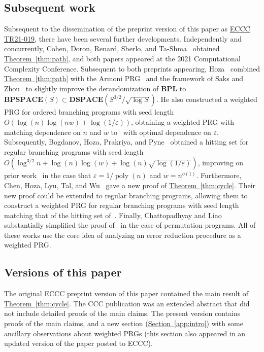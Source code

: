 \documentclass[11pt]{article}
\numberwithin{equation}{section}
\theoremstyle{definition}
\theoremstyle{plain}
\newcommand{\expref}[2]{\hyperref[#2]{#1~\ref{#2}}}
\newcommand{\eps}{\varepsilon}
\newcommand{\poly}{\operatorname{poly}}
\begin{document}
\subsection{Subsequent work}
Subsequent to the dissemination of the preprint version of this %
paper %
%
%
%
%
%
%
as \href{https://eccc.weizmann.ac.il/report/2021/019/}{ECCC TR21-019},
there have been several further developments. Independently and concurrently, Cohen, Doron, Renard, Sberlo, and Ta-Shma~\cite{CohenDoReSbTa21} obtained \expref{Theorem}{thm:path}, and both papers appeared at the 2021 Computational Complexity Conference. 
%
Subsequent to both preprints appearing, Hoza~\cite{Hoza21} combined \expref{Theorem}{thm:path} with the Armoni PRG~\cite{Armoni98} and the framework of Saks and Zhou~\cite{SaksZh99} to slightly improve the derandomization of $\mathbf{BPL}$ to %
$\mathbf{BPSPACE}(S)\subset \mathbf{DSPACE}(S^{3/2}/\sqrt{\log S})$. %
He also constructed a weighted PRG for ordered branching programs with seed length $O(\log(n)\log(nw)+\log(1/\eps))$, obtaining a weighted PRG with matching dependence on $n$ and $w$ to~\cite{Nisan92} with optimal dependence on $\eps$. 
%
%
Subsequently, 
%
Bogdanov, Hoza, Prakriya, and Pyne~\cite{BHPP22} obtained a hitting set for regular branching programs with seed length $O(\log^{3/2}n+\log(n)\log(w)+\log(n)\sqrt{\log(1/\eps)})$, improving on prior work~\cite{BravermanRaRaYe10} in the case that $\eps=1/\poly(n)$ and $w=n^{o(1)}$. %
%
Furthermore, Chen, Hoza, Lyu, Tal, and Wu~\cite{CHLTW23} gave a new proof of \expref{Theorem}{thm:cycle}. Their new proof could be extended to regular branching programs, allowing them to construct a weighted PRG for regular branching programs with seed length matching that of the hitting set of~\cite{BHPP22}. Finally, Chattopadhyay and Liao~\cite{CL24} substantially simplified the proof of~\cite{CHLTW23} in the case of permutation programs. All of these works use the core idea of analyzing an error reduction procedure as a weighted PRG.

\subsection{Versions of this paper}
The original ECCC preprint version of this paper contained the main result of \expref{Theorem}{thm:cycle}. The CCC publication was an extended abstract that did not include detailed proofs of the main claims. The present version contains proofs of the main claims, and a new section (\expref{Section}{app:intro}) with some ancillary observations about weighted PRGs (this section also appeared in an updated version of the paper posted to ECCC).
%
\end{document}
